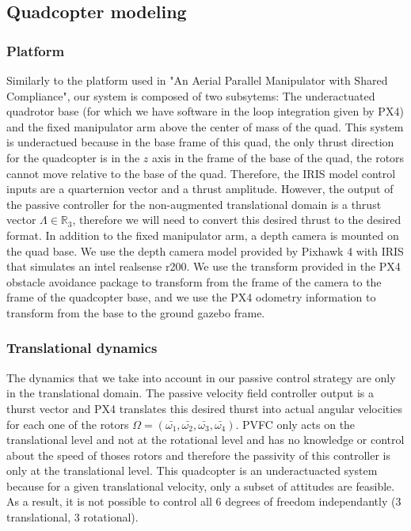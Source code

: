 \subsection{Quadcopter modeling}
\subsubsection{Platform}
Similarly to the platform used in "An Aerial Parallel Manipulator with Shared Compliance", our system is composed of two subsytems: The underactuated quadrotor base (for which we have software in the loop integration given by PX4) and the fixed manipulator arm above the center of mass of the quad.
This system is underactued because in the base frame of this quad, the only thrust direction for the quadcopter is in the $z$ axis in the frame of the base of the quad, the rotors cannot move relative to the base of the quad. Therefore, the IRIS model control inputs are a quarternion vector and a thrust amplitude. However, the output of the passive controller for the non-augmented translational domain is a thrust vector $\Lambda \in\mathbb R_3 $, therefore we will need to convert this desired thrust to the desired format.
In addition to the fixed manipulator arm, a depth camera is mounted on the quad base. We use the depth camera model provided by Pixhawk 4 with IRIS that simulates an intel realsense r200. We use the transform provided in the PX4 obstacle avoidance package to transform from the frame of the camera to the frame of the quadcopter base, and we use the PX4 odometry information to transform from the base to the ground gazebo frame.

\subsubsection{Translational dynamics}

The dynamics that we take into account in our passive control strategy are only in the translational domain. The passive velocity field controller output is a thurst vector and PX4 translates this desired thurst into actual angular velocities for each one of the rotors 
$\Omega = (\bar{\omega_1}, \bar{\omega_2}, \bar{\omega_3}, \bar{\omega_4})$. PVFC only acts on the translational level and not at the rotational level and has no knowledge or control about the speed of thoses rotors and therefore the passivity of this controller is only at the translational level. 
This quadcopter is an underactuacted system because for a given translational velocity, only a subset of attitudes are feasible. As a result, it is not possible to control all 6 degrees of freedom independantly (3 translational, 3 rotational).
 
